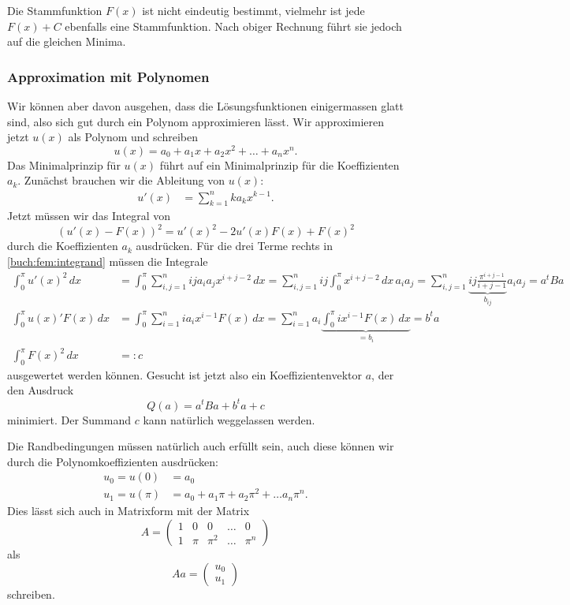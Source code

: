 Die Stammfunktion $F(x)$ ist nicht eindeutig bestimmt, vielmehr
ist jede $F(x)+C$ ebenfalls eine Stammfunktion.
Nach obiger Rechnung führt sie jedoch auf die gleichen Minima.

\subsubsection{Approximation mit Polynomen}
Wir können aber davon ausgehen, dass die Lösungsfunktionen einigermassen
glatt sind, also sich gut durch ein Polynom approximieren lässt.
Wir approximieren jetzt $u(x)$ als Polynom und schreiben
\[
u(x) = a_0 + a_1x + a_2x^2 + \dots + a_nx^n.
\]
Das Minimalprinzip für $u(x)$ führt auf ein Minimalprinzip für 
die Koeffizienten $a_k$.
%
Zunächst brauchen wir die Ableitung von $u(x)$:
\begin{align*}
u'(x) &= \sum_{k=1}^n ka_kx^{k-1}.
\end{align*}
Jetzt müssen wir das Integral von
\begin{equation}
(u'(x)-F(x))^2
=
u'(x)^2 - 2u'(x)F(x) + F(x)^2
\label{buch:fem:integrand}
\end{equation}
durch 
die Koeffizienten $a_k$ ausdrücken.
Für die drei Terme rechts in \eqref{buch:fem:integrand} müssen die Integrale
\begin{align*}
\int_0^\pi u'(x)^2\,dx
&=
\int_0^\pi
\sum_{i,j=1}^n ija_ia_jx^{i+j-2}
\,dx
=
\sum_{i,j=1}^n ij \int_0^\pi x^{i+j-2}\,dx\, a_ia_j
=
\sum_{i,j=1}^n
\underbrace{ij \frac{\pi^{i+j-1}}{i+j-1}}_{\displaystyle b_{ij}}
a_ia_j
=
a^tBa
\\
\int_0^\pi u(x)'F(x) \,dx
&=
\int_0^\pi \sum_{i=1}^n ia_i x^{i-1} F(x) \,dx
=
\sum_{i=1}^n
a_i
\underbrace{\int_0^\pi 
ix^{i-1} F(x)\,dx}_{\displaystyle =b_i}
=
b^t a
\\
\int_0^\pi F(x)^2\,dx &=: c
\end{align*}
ausgewertet werden können.
Gesucht ist jetzt also ein Koeffizientenvektor $a$, der den Ausdruck
%
\[
Q(a) = a^t B a + b^t a + c
\]
minimiert.
Der Summand $c$ kann natürlich weggelassen werden.

Die Randbedingungen müssen natürlich auch erfüllt sein, auch
diese können wir durch die Polynomkoeffizienten ausdrücken:
\begin{align*}
u_0=u(0)   &= a_0
\\
u_1=u(\pi) &= a_0 + a_1\pi + a_2\pi^2+\dots a_n\pi^n.
\end{align*}
Dies lässt sich auch in Matrixform mit der Matrix
\[
A=\begin{pmatrix}
1&0&0&\dots&0\\
1&\pi&\pi^2&\dots&\pi^n
\end{pmatrix}
\]
als
\[
Aa = \begin{pmatrix}u_0\\u_1\end{pmatrix}
\]
schreiben.

